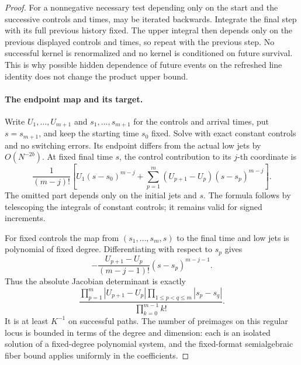\begin{proof}
For a nonnegative necessary test depending only on the start and
the successive controls and times,  may
be iterated backwards.  Integrate the final step with its full
previous history fixed.  The upper integral then depends only
on the previous displayed controls and times, so repeat with the
previous step.  No successful kernel is renormalized and no kernel
is conditioned on future survival.  This is why possible hidden
dependence of future events on the refreshed line identity does
not change the product upper bound.

\paragraph{The endpoint map and its target.}
Write \(U_1,\ldots,U_{m+1}\) and \(s_1,\ldots,s_{m+1}\) for the
controls and arrival times, put \(s=s_{m+1}\), and keep the starting
time \(s_0\) fixed.  Solve  with exact
constant controls and no switching errors.  Its endpoint differs
from the actual low jets by \(O(N^{-2b})\).  At fixed final time
\(s\), the control contribution to its \(j\)-th coordinate is
\begin{equation}
 \frac1{(m-j)!}
 \left[
 U_1(s-s_0)^{m-j}
 +\sum_{p=1}^m(U_{p+1}-U_p)(s-s_p)^{m-j}
 \right].
 \label{a02:endpoint-polynomial}
\end{equation}
The omitted part depends only on the initial jets and \(s\).
The formula follows by telescoping the integrals of constant
controls; it remains valid for signed increments.

For fixed controls the map from
\((s_1,\ldots,s_m,s)\) to the final time and low jets is polynomial
of fixed degree.  Differentiating 
with respect to \(s_p\) gives
\[
 -\frac{U_{p+1}-U_p}{(m-j-1)!}(s-s_p)^{m-j-1}.
\]
Thus the absolute Jacobian determinant is exactly
\begin{equation}
 \frac{\displaystyle
 \prod_{p=1}^m|U_{p+1}-U_p|
 \prod_{1\le p<q\le m}|s_p-s_q|}
 {\displaystyle\prod_{k=0}^{m-1}k!}.
 \label{a02:endpoint-jacobian}
\end{equation}
It is at least \(K^{-1}\) on successful paths.  The number of
preimages on this regular locus is bounded in terms of the degree
and dimension: each is an isolated solution of a fixed-degree
polynomial system, and the fixed-format semialgebraic fiber bound
applies uniformly in the coefficients.


\end{proof}
